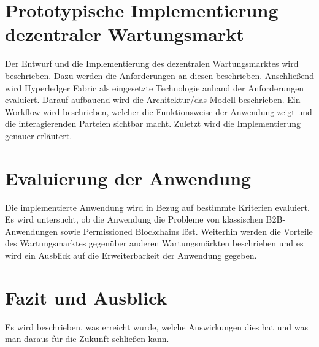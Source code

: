 \documentclass{llncs}
\begin{document}
\section{Prototypische Implementierung dezentraler Wartungsmarkt}
Der Entwurf und die Implementierung des dezentralen Wartungsmarktes wird beschrieben. Dazu werden die Anforderungen an diesen beschrieben. Anschließend wird Hyperledger Fabric als eingesetzte Technologie anhand der Anforderungen evaluiert. Darauf aufbauend wird die Architektur/das Modell beschrieben. Ein Workflow wird beschrieben, welcher die Funktionsweise der Anwendung zeigt und die interagierenden Parteien sichtbar macht. Zuletzt wird die Implementierung genauer erläutert.

\section{Evaluierung der Anwendung}
Die implementierte Anwendung wird in Bezug auf bestimmte Kriterien evaluiert. Es wird untersucht, ob die Anwendung die Probleme von klassischen B2B-Anwendungen sowie Permissioned Blockchains löst. Weiterhin werden die Vorteile des Wartungsmarktes gegenüber anderen Wartungsmärkten beschrieben und es wird ein Ausblick auf die Erweiterbarkeit der Anwendung gegeben.

\section{Fazit und Ausblick}
Es wird beschrieben, was erreicht wurde, welche Auswirkungen dies hat und was man daraus für die Zukunft schließen kann.

\nocite{*}


\end{document}
